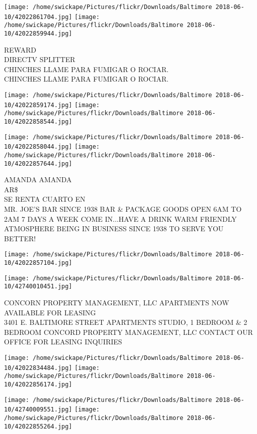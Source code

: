 \documentclass[10pt,letterpaper]{article}
\begin{document}
\texttt{[image: /home/swickape/Pictures/flickr/Downloads/Baltimore 2018-06-10/42022861704.jpg]}
\texttt{[image: /home/swickape/Pictures/flickr/Downloads/Baltimore 2018-06-10/42022859944.jpg]}

REWARD\\
DIRECTV SPLITTER\\
CHINCHES LLAME PARA FUMIGAR O ROCIAR.\\
CHINCHES LLAME PARA FUMIGAR O ROCIAR.
\pagebreak

\texttt{[image: /home/swickape/Pictures/flickr/Downloads/Baltimore 2018-06-10/42022859174.jpg]}
\texttt{[image: /home/swickape/Pictures/flickr/Downloads/Baltimore 2018-06-10/42022858544.jpg]}

\texttt{[image: /home/swickape/Pictures/flickr/Downloads/Baltimore 2018-06-10/42022858044.jpg]}
\texttt{[image: /home/swickape/Pictures/flickr/Downloads/Baltimore 2018-06-10/42022857644.jpg]}

AMANDA AMANDA\\
AR\$\\
SE RENTA CUARTO EN\\
MR. JOE'S BAR SINCE 1938 BAR \& PACKAGE GOODS OPEN 6AM TO 2AM 7 DAYS A WEEK COME IN...HAVE A DRINK WARM FRIENDLY ATMOSPHERE BEING IN BUSINESS SINCE 1938 TO SERVE YOU BETTER!
\pagebreak

\texttt{[image: /home/swickape/Pictures/flickr/Downloads/Baltimore 2018-06-10/42022857104.jpg]}

\vspace{0.25in}
\texttt{[image: /home/swickape/Pictures/flickr/Downloads/Baltimore 2018-06-10/42740010451.jpg]}

CONCORN PROPERTY MANAGEMENT, LLC APARTMENTS NOW AVAILABLE FOR LEASING\\
3401 E. BALTIMORE STREET APARTMENTS STUDIO, 1 BEDROOM \& 2 BEDROOM CONCORD PROPERTY MANAGEMENT, LLC CONTACT OUR OFFICE FOR LEASING INQUIRIES
\pagebreak

\texttt{[image: /home/swickape/Pictures/flickr/Downloads/Baltimore 2018-06-10/42022834484.jpg]}
\texttt{[image: /home/swickape/Pictures/flickr/Downloads/Baltimore 2018-06-10/42022856174.jpg]}

\texttt{[image: /home/swickape/Pictures/flickr/Downloads/Baltimore 2018-06-10/42740009551.jpg]}
\texttt{[image: /home/swickape/Pictures/flickr/Downloads/Baltimore 2018-06-10/42022855264.jpg]}
\end{document}
